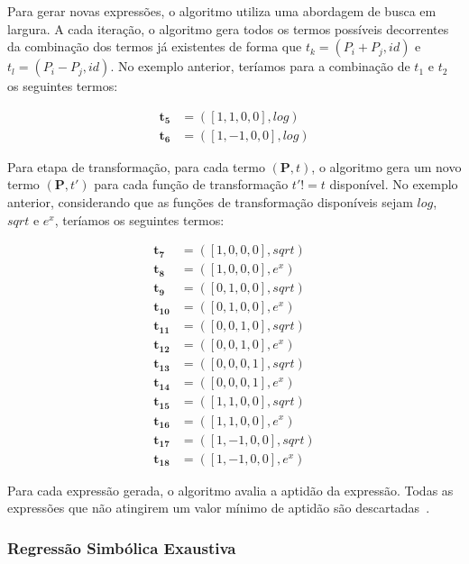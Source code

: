 Para gerar novas expressões, o algoritmo utiliza uma abordagem de busca em largura. A cada iteração, o algoritmo gera todos os termos possíveis decorrentes da combinação dos termos já existentes de forma que $t_k = (P_i + P_j, id)$ e $t_l = (P_i - P_j, id)$. No exemplo anterior, teríamos para a combinação de $t_1$ e $t_2$ os seguintes termos:

\begin{equation}
  \begin{aligned}
    \mathbf{t_5} &= ([1, 1, 0, 0], log) \\
    \mathbf{t_6} &= ([1, -1, 0, 0], log)
  \end{aligned}
\end{equation}

Para etapa de transformação, para cada termo $(\mathbf{P}, t)$, o algoritmo gera um novo termo $(\mathbf{P}, t')$ para cada função de transformação $t' != t$ disponível. No exemplo anterior, considerando que as funções de transformação disponíveis sejam $log$,  $sqrt$ e $e^x$, teríamos os seguintes termos:

\begin{equation}
  \begin{aligned}
    \mathbf{t_7} &= ([1, 0, 0, 0], sqrt) \\
    \mathbf{t_8} &= ([1, 0, 0, 0], e^x) \\
    \mathbf{t_9} &= ([0, 1, 0, 0], sqrt) \\
    \mathbf{t_{10}} &= ([0, 1, 0, 0], e^x) \\
    \mathbf{t_{11}} &= ([0, 0, 1, 0], sqrt) \\
    \mathbf{t_{12}} &= ([0, 0, 1, 0], e^x) \\
    \mathbf{t_{13}} &= ([0, 0, 0, 1], sqrt) \\
    \mathbf{t_{14}} &= ([0, 0, 0, 1], e^x) \\
    \mathbf{t_{15}} &= ([1, 1, 0, 0], sqrt) \\
    \mathbf{t_{16}} &= ([1, 1, 0, 0], e^x) \\
    \mathbf{t_{17}} &= ([1, -1, 0, 0], sqrt) \\
    \mathbf{t_{18}} &= ([1, -1, 0, 0], e^x)
  \end{aligned}
\end{equation}

Para cada expressão gerada, o algoritmo avalia a aptidão da expressão. Todas as expressões que não atingirem um valor mínimo de aptidão são descartadas~\cite{lsritr}.

\subsubsection{Regressão Simbólica Exaustiva}

